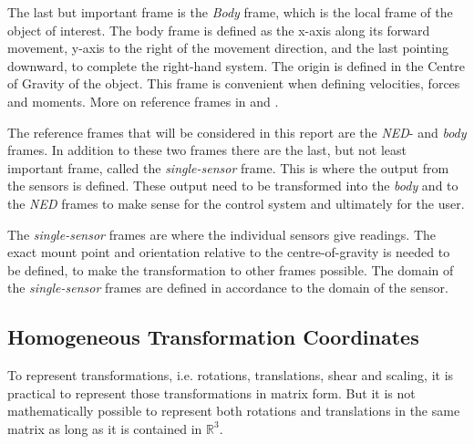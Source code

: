 	The last but important frame is the \emph{Body} frame, which is the local frame of the object of interest.
	The body frame is defined as the x-axis along its forward movement, y-axis to the right of the
	movement direction, and the last pointing downward, to complete the right-hand system. The
	origin is defined in the Centre of Gravity of the object. This frame is convenient when
	defining velocities, forces and moments. More on reference frames in \cite{fossen} and
    \cite{forsell}.

    The reference frames that will be considered in this report are the \emph{NED}- and
    \emph{body} frames. In addition to these two frames there are the last, but not least
    important frame, called the \emph{single-sensor} frame. This is where the output from
    the sensors is defined. These output need to be transformed into the \emph{body} and
    to the \emph{NED} frames to make sense for the control system and ultimately for the
    user. 

    The \emph{single-sensor} frames are where the individual sensors give readings. The
    exact mount point and orientation relative to the centre-of-gravity is needed to be defined, to make the
    transformation to other frames possible. The domain of the \emph{single-sensor} frames
    are defined in accordance to the domain of the sensor.


\subsection{Homogeneous Transformation Coordinates}
To represent transformations, i.e. rotations, translations, shear and scaling, it is
practical to represent those transformations in matrix form. But it is not mathematically
possible to represent both rotations and translations in the same matrix as long as it is
contained in $\mathbb{R}^3$. 

